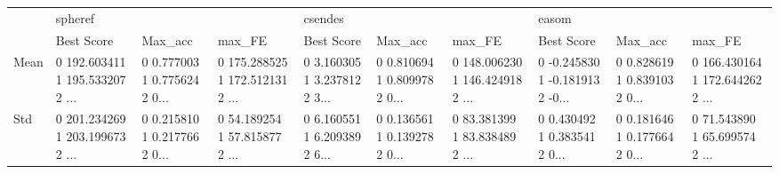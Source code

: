 \begin{tabular}{llllllllll}
\toprule
{} & \multicolumn{3}{l}{spheref} & \multicolumn{3}{l}{csendes} & \multicolumn{3}{l}{easom} \\
{} &                                         Best Score &                                            Max\_acc &                                             max\_FE &                                         Best Score &                                            Max\_acc &                                             max\_FE &                                         Best Score &                                            Max\_acc &                                             max\_FE \\
\midrule
Mean &  0        192.603411
1        195.533207
2     ... &  0        0.777003
1        0.775624
2        0... &  0        175.288525
1        172.512131
2     ... &  0        3.160305
1        3.237812
2        3... &  0        0.810694
1        0.809978
2        0... &  0        148.006230
1        146.424918
2     ... &  0       -0.245830
1       -0.181913
2       -0... &  0        0.828619
1        0.839103
2        0... &  0        166.430164
1        172.644262
2     ... \\
Std  &  0        201.234269
1        203.199673
2     ... &  0        0.215810
1        0.217766
2        0... &  0        54.189254
1        57.815877
2       ... &  0        6.160551
1        6.209389
2        6... &  0        0.136561
1        0.139278
2        0... &  0        83.381399
1        83.838489
2       ... &  0        0.430492
1        0.383541
2        0... &  0        0.181646
1        0.177664
2        0... &  0        71.543890
1        65.699574
2       ... \\
\bottomrule
\end{tabular}
